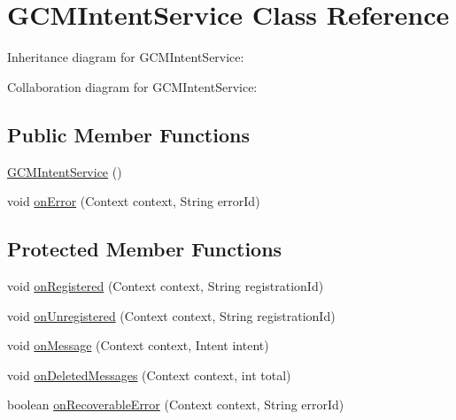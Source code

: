 \hypertarget{classcom_1_1axcoto_1_1shinjuku_1_1sushi_1_1_g_c_m_intent_service}{\section{\-G\-C\-M\-Intent\-Service \-Class \-Reference}
\label{classcom_1_1axcoto_1_1shinjuku_1_1sushi_1_1_g_c_m_intent_service}
}


\-Inheritance diagram for \-G\-C\-M\-Intent\-Service\-:


\-Collaboration diagram for \-G\-C\-M\-Intent\-Service\-:
\subsection*{\-Public \-Member \-Functions}
\begin{DoxyCompactItemize}
\item 
\hyperlink{classcom_1_1axcoto_1_1shinjuku_1_1sushi_1_1_g_c_m_intent_service_a58608fa04bb37a19faa283085da2f45c}{\-G\-C\-M\-Intent\-Service} ()
\item 
void \hyperlink{classcom_1_1axcoto_1_1shinjuku_1_1sushi_1_1_g_c_m_intent_service_ae37637d7c0d211ad2eabedbe9fd1868d}{on\-Error} (\-Context context, \-String error\-Id)
\end{DoxyCompactItemize}
\subsection*{\-Protected \-Member \-Functions}
\begin{DoxyCompactItemize}
\item 
void \hyperlink{classcom_1_1axcoto_1_1shinjuku_1_1sushi_1_1_g_c_m_intent_service_a728b0ab7da9ddde56987bd076805cd82}{on\-Registered} (\-Context context, \-String registration\-Id)
\item 
void \hyperlink{classcom_1_1axcoto_1_1shinjuku_1_1sushi_1_1_g_c_m_intent_service_a1895cf62d624c24fbc1ff2eaeef76064}{on\-Unregistered} (\-Context context, \-String registration\-Id)
\item 
void \hyperlink{classcom_1_1axcoto_1_1shinjuku_1_1sushi_1_1_g_c_m_intent_service_a0e3f670228c7669e83881949ce01a5b1}{on\-Message} (\-Context context, \-Intent intent)
\item 
void \hyperlink{classcom_1_1axcoto_1_1shinjuku_1_1sushi_1_1_g_c_m_intent_service_a5a09fc23e1e041a0cdd718ef858e971d}{on\-Deleted\-Messages} (\-Context context, int total)
\item 
boolean \hyperlink{classcom_1_1axcoto_1_1shinjuku_1_1sushi_1_1_g_c_m_intent_service_afb513b7107b20cc9a40bcb9b31a9ecca}{on\-Recoverable\-Error} (\-Context context, \-String error\-Id)
\end{DoxyCompactItemize}


